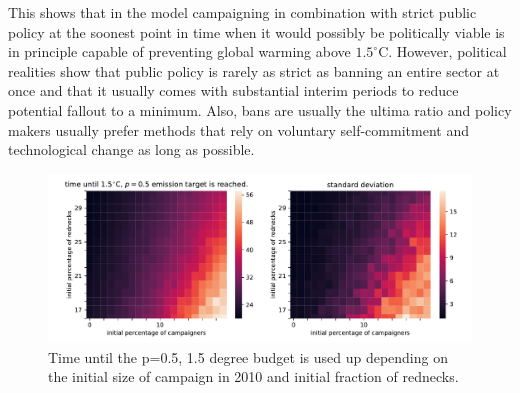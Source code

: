 This shows that in the model campaigning in combination with strict public policy at the soonest point in time when it would possibly be politically viable is in principle capable of preventing global warming above $1.5^{\circ}$C.
However, political realities show that public policy is rarely as strict as banning an entire sector at once and that it usually comes with substantial interim periods to reduce potential fallout to a minimum. Also, bans are usually the ultima ratio and policy makers usually prefer methods that rely on voluntary self-commitment and technological change as long as possible.

\begin{figure}[t]
    \centering
    \includegraphics[width = \textwidth]{figures/time_until_emissions_target.pdf}
    \caption{Time until the p=0.5, 1.5 degree budget is used up depending on the initial size of campaign in 2010 and initial fraction of rednecks.}
    \label{fig:time_until_budget_reached}
\end{figure}

